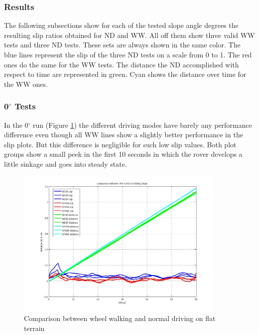 \documentclass[a4paper,twocolumn]{esapub2005} %
\begin{document}
\subsubsection{Results} 
The following subsections show for each of the tested slope angle degrees the resulting slip ratios obtained for ND and WW. All off them show three valid WW tests and three ND tests. These sets are always shown in the same color. The blue lines represent the slip of the three ND tests on a scale from 0 to 1. The red ones do the same for the WW tests. The distance the ND accomplished with respect to 
time are represented in green. Cyan shows the distance over time for the WW ones.

\subsubsection*{0$^{\circ}$ Tests}
In the 0$^\circ$ run (Figure \ref{fig:00d}) the different driving modes have
barely any performance difference even though all WW lines show a slightly
better performance in the slip plots. But this difference is negligible for
such low slip values. Both plot groups show a small peek in the first 10
seconds in which the rover develops a little sinkage and goes into steady
state. 

\begin{figure}[h!]
    \centering
    \includegraphics[width=0.9\textwidth]{00d.jpg}
    \caption{Comparison between wheel walking and normal driving on flat terrain}
    \label{fig:00d}
\end{figure}
\end{document}
